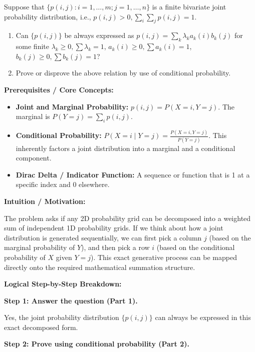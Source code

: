 \begin{exercise}\label{probability:2012:3}
Suppose that $\{ p(i, j) : i = 1, \dots, m; j = 1, \dots, n \}$ is a finite bivariate joint probability distribution, i.e., $p(i, j) > 0, \sum_i \sum_j p(i, j) = 1$.
\begin{enumerate}
    \item Can $\{ p(i, j) \}$ be always expressed as $p(i, j) = \sum_k \lambda_k a_k(i) b_k(j)$ for some finite $\lambda_k \geq 0, \sum \lambda_k = 1$, $a_k(i) \geq 0, \sum a_k(i) = 1$, $b_k(j) \geq 0, \sum b_k(j) = 1$?
    \item Prove or disprove the above relation by use of conditional probability.
\end{enumerate}
\end{exercise}

\begin{solution}
\textbf{Prerequisites / Core Concepts:}
\begin{itemize}
    \item \textbf{Joint and Marginal Probability:} $p(i, j) = P(X=i, Y=j)$. The marginal is $P(Y=j) = \sum_i p(i, j)$.
    \item \textbf{Conditional Probability:} $P(X=i \mid Y=j) = \frac{P(X=i, Y=j)}{P(Y=j)}$. This inherently factors a joint distribution into a marginal and a conditional component.
    \item \textbf{Dirac Delta / Indicator Function:} A sequence or function that is 1 at a specific index and 0 elsewhere.
\end{itemize}

\textbf{Intuition / Motivation:}

The problem asks if any 2D probability grid can be decomposed into a weighted sum of independent 1D probability grids. If we think about how a joint distribution is generated sequentially, we can first pick a column $j$ (based on the marginal probability of $Y$), and then pick a row $i$ (based on the conditional probability of $X$ given $Y=j$). This exact generative process can be mapped directly onto the required mathematical summation structure.

\textbf{Logical Step-by-Step Breakdown:}

\textbf{Step 1: Answer the question (Part 1).}

Yes, the joint probability distribution $\{p(i, j)\}$ can always be expressed in this exact decomposed form.

\textbf{Step 2: Prove using conditional probability (Part 2).}


\end{solution}
